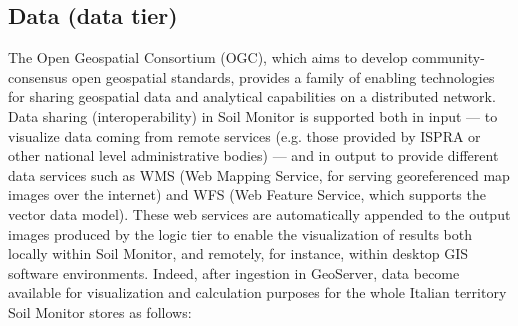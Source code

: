\documentclass[APA,LATO1COL,doublespace]{WileyNJD-v2}
\newcommand{\update}[1]{\emph{\textcolor{blue}{#1}}}     %
\begin{document}
\subsection{Data (data tier) }
\label{sec:dataTier}
The Open Geospatial Consortium (OGC), which aims to develop community-consensus open geospatial standards, provides a family of enabling technologies for sharing geospatial data and analytical capabilities on a distributed network. 
Data sharing (interoperability) in Soil Monitor is supported both in input --- to visualize data coming from remote services (e.g. those provided by ISPRA or other national level administrative bodies) --- and in output to provide different data services such as WMS (Web Mapping Service, for serving georeferenced map images over the internet) and WFS (Web Feature Service, which supports the vector data model). %
These web services are automatically appended to the output images produced by the logic tier %
to enable the visualization of results both locally within Soil Monitor, and remotely, for instance, within desktop GIS software environments.
Indeed, after ingestion in GeoServer, data become available for visualization and calculation purposes for the whole Italian territory Soil Monitor stores as follows:
\end{document}
